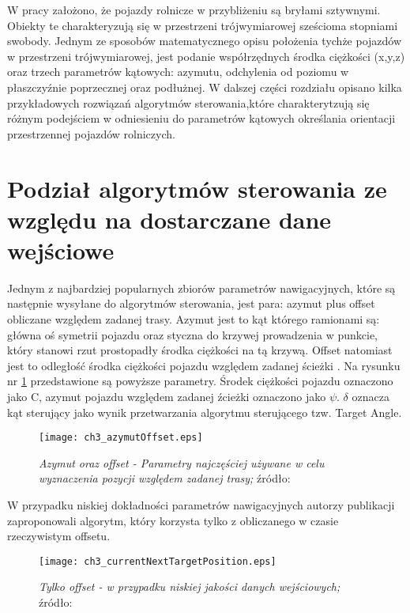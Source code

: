 W pracy założono, że pojazdy rolnicze w przybliżeniu są bryłami sztywnymi.
Obiekty te charakteryzują się w przestrzeni trójwymiarowej sześcioma stopniami swobody.
Jednym ze sposobów matematycznego opisu położenia tychże pojazdów w przestrzeni trójwymiarowej,
jest podanie współrzędnych środka ciężkości (x,y,z) oraz trzech parametrów kątowych: azymutu, odchylenia od poziomu w płaszczyźnie poprzecznej oraz podłużnej.
W dalszej części rozdziału opisano kilka przykładowych rozwiązań algorytmów sterowania,które charakterytzują się różnym podejściem 
w odniesieniu do parametrów kątowych określania orientacji przestrzennej pojazdów rolniczych. 
\section{Podział algorytmów sterowania ze względu na dostarczane dane wejściowe}
Jednym z najbardziej popularnych zbiorów parametrów nawigacyjnych, które są następnie wysyłane do algorytmów sterowania, jest para:
azymut plus offset obliczane względem zadanej trasy. Azymut jest to kąt którego ramionami są:
główna oś symetrii pojazdu oraz styczna do krzywej prowadzenia w punkcie, który stanowi rzut prostopadły środka ciężkości na tą krzywą.
Offset natomiast jest to odległość środka ciężkości pojazdu względem zadanej ścieżki \cite{CCTA_769_775}.
Na rysunku nr \ref{fig:ch3_azymutOffset} przedstawione są powyższe parametry. Środek ciężkości pojazdu oznaczono jako C,
azymut pojazdu względem zadanej źcieżki oznaczono jako $\psi$. $\delta$ oznacza kąt sterujący jako wynik przetwarzania algorytmu sterującego tzw. Target Angle.    
\begin{figure}[H] 
\centering
\texttt{[image: ch3\_azymutOffset.eps]}
\caption{\textit{Azymut oraz offset - Parametry najczęściej używane w celu wyznaczenia pozycji względem zadanej trasy;}
źródło: \cite[][strona 464]{CCTA5_461_469}}
\label{fig:ch3_azymutOffset}
\end{figure}

W przypadku niskiej dokładności parametrów nawigacyjnych autorzy publikacji \cite{CCTA_943_950}
zaproponowali algorytm, który korzysta tylko z obliczanego w czasie rzeczywistym offsetu.
\begin{figure}[H]
\centering
\texttt{[image: ch3\_currentNextTargetPosition.eps]}
\caption{\textit{Tylko offset - w przypadku niskiej jakości danych wejściowych;} 
	źródło: \cite[][strona 947]{CCTA_943_950}}
\label{fig:ch3_currentNextTargetPosition}
\end{figure}

